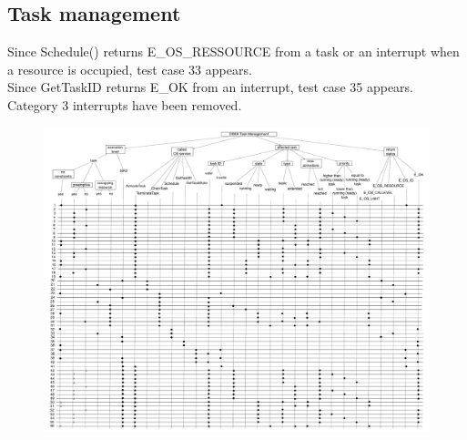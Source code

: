 \documentclass[10pt]{article}
\begin{document}
	\subsection{Task management}
	Since Schedule() returns E\_OS\_RESSOURCE from a task or an interrupt when a resource is occupied, test case 33 appears.\\
	Since GetTaskID returns E\_OK from an interrupt, test case 35 appears.\\
	Category 3 interrupts have been removed. \\

	\begin{figure}[htbp] %
   		\centering
		\includegraphics[width=1\textheight, angle=90]{graphics/OSEK_Task_Management.pdf}
	\end{figure}		
	
\end{document}
